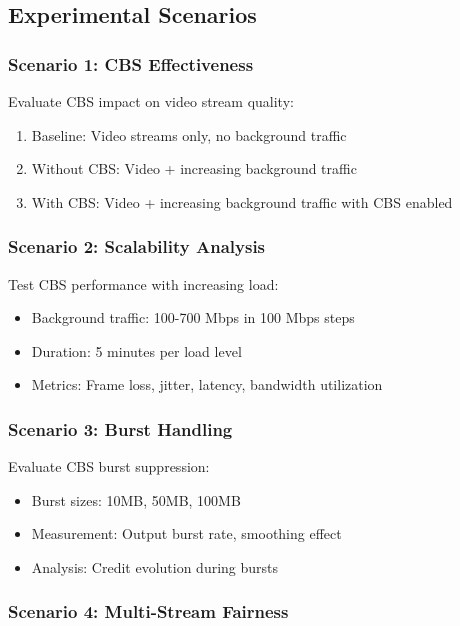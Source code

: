 \documentclass[10pt, journal, compsoc]{IEEEtran}
\begin{document}
\subsection{Experimental Scenarios}

\subsubsection{Scenario 1: CBS Effectiveness}

Evaluate CBS impact on video stream quality:
\begin{enumerate}
    \item Baseline: Video streams only, no background traffic
    \item Without CBS: Video + increasing background traffic
    \item With CBS: Video + increasing background traffic with CBS enabled
\end{enumerate}

\subsubsection{Scenario 2: Scalability Analysis}

Test CBS performance with increasing load:
\begin{itemize}
    \item Background traffic: 100-700 Mbps in 100 Mbps steps
    \item Duration: 5 minutes per load level
    \item Metrics: Frame loss, jitter, latency, bandwidth utilization
\end{itemize}

\subsubsection{Scenario 3: Burst Handling}

Evaluate CBS burst suppression:
\begin{itemize}
    \item Burst sizes: 10MB, 50MB, 100MB
    \item Measurement: Output burst rate, smoothing effect
    \item Analysis: Credit evolution during bursts
\end{itemize}

\subsubsection{Scenario 4: Multi-Stream Fairness}
\end{document}
